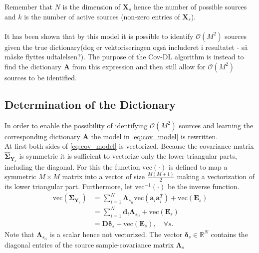 Remember that $N$ is the dimension of $\mathbf{X}_s$ hence the number of possible sources and $k$ is the number of active sources (non-zero entries of $\mathbf{X}_s$).
\\ \\
 It has been shown that by this model it is possible to identify $\mathcal{O}(M^2)$ sources given the true dictionary\cite{Pal2015}(dog er vektoriseringen også includeret i resultatet - så måske flyttes udtalelsen?). The purpose of the Cov-DL algorithm is instead to find the dictionary $\textbf{A}$ from this expression and then still allow for $\mathcal{O}(M^2)$ sources to be identified.

\subsection{Determination of the Dictionary}
In order to enable the possibility of identifying $\mathcal{O}(M^2)$ sources and learning the corresponding dictionary $\mathbf{A}$ the model in \eqref{eq:cov_model} is rewritten. 
\\ 
At first both sides of \eqref{eq:cov_model} is vectorized. Because the covariance matrix $\hat{\boldsymbol{\Sigma}}_{\mathbf{Y}_s}$ is symmetric it is sufficient to vectorize only the lower triangular parts, including the diagonal. For this the function $\text{vec}(\cdot)$ is defined to map a symmetric $M \times M$ matrix into a vector of size $\frac{M(M+1)}{2}$ making a vectorization of its lower triangular part. Furthermore, let vec$^{-1}(\cdot)$ be the inverse function.      
\begin{align}\label{eq:cov1}
\text{vec}(\boldsymbol{\Sigma}_{\mathbf{Y}_s}) &= \sum_{i=1}^N \boldsymbol{\Lambda}_{s_{ii}} \text{vec}(\mathbf{a}_i \mathbf{a}_i^T) + \text{vec}(\mathbf{E}_s) \nonumber \\
&= \sum_{i=1}^N \mathbf{d}_i \boldsymbol{\Lambda}_{s_{ii}} + \text{vec}(\mathbf{E}_s) \nonumber \\
&= \mathbf{D} \boldsymbol{\delta}_s + \text{vec}(\mathbf{E}_s), \quad \forall s.
\end{align}
Note that $\boldsymbol{\Lambda}_{s_{ii}}$ is a scalar hence not vectorized. The vector $\boldsymbol{\delta}_s \in \mathbb{R}^{N}$ contains the diagonal entries of the source sample-covariance matrix $\boldsymbol{\Lambda}_s$
